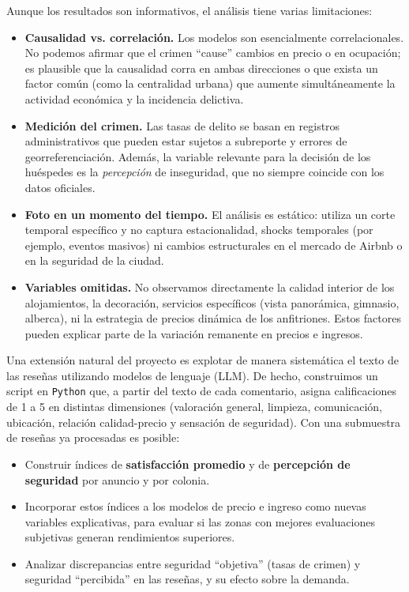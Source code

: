 \documentclass[12pt]{article}
\begin{document}
Aunque los resultados son informativos, el análisis tiene varias limitaciones:

\begin{itemize}
  \item \textbf{Causalidad vs. correlación.} Los modelos son esencialmente correlacionales. No podemos afirmar que el crimen “cause” cambios en precio o en ocupación; es plausible que la causalidad corra en ambas direcciones o que exista un factor común (como la centralidad urbana) que aumente simultáneamente la actividad económica y la incidencia delictiva.
  \item \textbf{Medición del crimen.} Las tasas de delito se basan en registros administrativos que pueden estar sujetos a subreporte y errores de georreferenciación. Además, la variable relevante para la decisión de los huéspedes es la \emph{percepción} de inseguridad, que no siempre coincide con los datos oficiales.
  \item \textbf{Foto en un momento del tiempo.} El análisis es estático: utiliza un corte temporal específico y no captura estacionalidad, shocks temporales (por ejemplo, eventos masivos) ni cambios estructurales en el mercado de Airbnb o en la seguridad de la ciudad.
  \item \textbf{Variables omitidas.} No observamos directamente la calidad interior de los alojamientos, la decoración, servicios específicos (vista panorámica, gimnasio, alberca), ni la estrategia de precios dinámica de los anfitriones. Estos factores pueden explicar parte de la variación remanente en precios e ingresos.
\end{itemize}

Una extensión natural del proyecto es explotar de manera sistemática el texto de las reseñas utilizando modelos de lenguaje (LLM). De hecho, construimos un script en \texttt{Python} que, a partir del texto de cada comentario, asigna calificaciones de 1 a 5 en distintas dimensiones (valoración general, limpieza, comunicación, ubicación, relación calidad-precio y sensación de seguridad). Con una submuestra de reseñas ya procesadas es posible:

\begin{itemize}
  \item Construir índices de \textbf{satisfacción promedio} y de \textbf{percepción de seguridad} por anuncio y por colonia.
  \item Incorporar estos índices a los modelos de precio e ingreso como nuevas variables explicativas, para evaluar si las zonas con mejores evaluaciones subjetivas generan rendimientos superiores.
  \item Analizar discrepancias entre seguridad “objetiva” (tasas de crimen) y seguridad “percibida” en las reseñas, y su efecto sobre la demanda.
\end{itemize}
\end{document}
